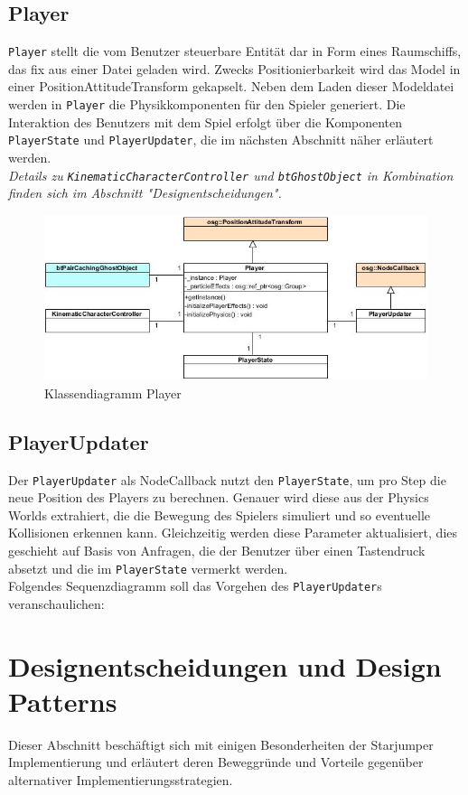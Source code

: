 \documentclass{llncs}
\begin{document}
\subsection{Player}
\texttt{Player} stellt die vom Benutzer steuerbare Entit\"at dar in Form eines Raumschiffs, das fix aus einer Datei
geladen wird. Zwecks Positionierbarkeit wird das Model in einer PositionAttitudeTransform gekapselt.
Neben dem Laden dieser Modeldatei werden in \texttt{Player} die Physikkomponenten f\"ur den Spieler generiert.
Die Interaktion des Benutzers mit dem Spiel erfolgt \"uber die Komponenten \texttt{PlayerState} und \texttt{PlayerUpdater},
die im n\"achsten Abschnitt n\"aher erl\"autert werden.\\
\textit{Details zu \texttt{KinematicCharacterController} und \texttt{btGhostObject} in Kombination finden sich im Abschnitt "Designentscheidungen".}

\begin{figure}[H]
	\centering
	\includegraphics[width=1\textwidth]{Player.jpg}
	\caption{Klassendiagramm Player}
\end{figure}

\subsection{PlayerUpdater}
Der \texttt{PlayerUpdater} als NodeCallback nutzt den \texttt{PlayerState}, um pro Step die neue Position des Players
zu berechnen. Genauer wird diese aus der Physics Worlds extrahiert, die die Bewegung des Spielers simuliert und so
eventuelle Kollisionen erkennen kann. Gleichzeitig werden diese Parameter aktualisiert, dies geschieht auf Basis von
Anfragen, die der Benutzer \"uber einen Tastendruck absetzt und die im \texttt{PlayerState} vermerkt werden.\\
Folgendes Sequenzdiagramm soll das Vorgehen des \texttt{PlayerUpdater}s veranschaulichen:

\section{Designentscheidungen und Design Patterns}
Dieser Abschnitt besch\"aftigt sich mit einigen Besonderheiten der Starjumper Implementierung und erl\"autert deren
Beweggr\"unde und Vorteile gegen\"uber alternativer Implementierungsstrategien.
\end{document}
